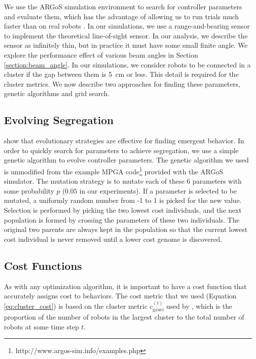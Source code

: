 \documentclass[conference]{IEEEtran}
\begin{document}
    We use the ARGoS simulation environment to search for controller parameters and evaluate them, which has the advantage of allowing us to run trials much faster than on real robots \cite{pinciroli_argos:_2012}. In our simulations, we use a range-and-bearing sensor to implement the theoretical line-of-sight sensor. In our analysis, we describe the sensor as infinitely thin, but in practice it must have some small finite angle. We explore the performance effect of various beam angles in Section \ref{section:beam_angle}. In our simulations, we consider robots to be connected in a cluster if the gap between them is \SI{5}{\centi\meter} or less. This detail is required for the cluster metrics. We now describe two approaches for finding these parameters, genetic algorithms and grid search.

  \subsection{Evolving Segregation}

    \cite{bahgeci_evolving_2005}\cite{johnson_evolving_2016}\cite{dorigo_evolving_2004} show that evolutionary strategies are effective for finding emergent behavior. In order to quickly search for parameters to achieve segregation, we use a simple genetic algorithm to evolve controller parameters. The genetic algorithm we used is unmodified from the example MPGA code\footnote{http://www.argos-sim.info/examples.php} provided with the ARGoS simulator. The mutation strategy is to mutate each of these 6 parameters with some probability $p$ ($0.05$ in our experiments). If a parameter is selected to be mutated, a uniformly random number from -1 to 1 is picked for the new value. Selection is performed by picking the two lowest cost individuals, and the next population is formed by crossing the parameters of these two individuals. The original two parents are always kept in the population so that the current lowest cost individual is never removed until a lower cost genome is discovered.

  \subsection{Cost Functions}

    As with any optimization algorithm, it is important to have a cost function that accurately assigns cost to behaviors. The cost metric that we used (Equation \eqref{eq:cluster_cost}) is based on the cluster metric $c_{\text{gauci}}^{(t)}$ used by \cite{gauci_self-organized_2014}, which is the proportion of the number of robots in the largest cluster to the total number of robots at some time step $t$.
\end{document}
